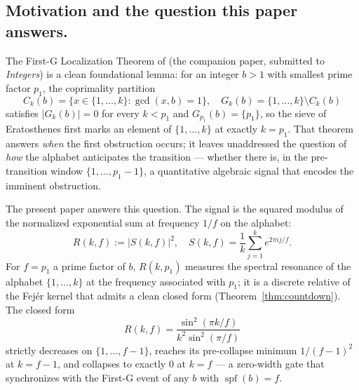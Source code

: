 \documentclass[11pt,reqno]{amsart}
\theoremstyle{plain}
\theoremstyle{definition}
\theoremstyle{remark}
\DeclareMathOperator{\spf}{spf}
\begin{document}
\subsection*{Motivation and the question this paper answers.}

The First-G Localization Theorem of \cite{J04Sanders} (the companion
paper, submitted to \emph{Integers}) is a clean foundational lemma:
for an integer $b > 1$ with smallest prime factor $p_1$, the
coprimality partition
\[
  C_k(b) = \{x \in \{1, \ldots, k\} : \gcd(x, b) = 1\},
  \quad
  G_k(b) = \{1, \ldots, k\} \setminus C_k(b)
\]
satisfies $|G_k(b)| = 0$ for every $k < p_1$ and
$G_{p_1}(b) = \{p_1\}$, so the sieve of Eratosthenes first marks an
element of $\{1, \ldots, k\}$ at exactly $k = p_1$. That theorem
answers \emph{when} the first obstruction occurs; it leaves
unaddressed the question of \emph{how} the alphabet anticipates the
transition --- whether there is, in the pre-transition window
$\{1, \ldots, p_1 - 1\}$, a quantitative algebraic signal that
encodes the imminent obstruction.

The present paper answers this question. The signal is the squared
modulus of the normalized exponential sum at frequency $1/f$ on the
alphabet:
\begin{equation}
  R(k, f) := |S(k, f)|^2,
  \quad
  S(k, f) = \frac{1}{k} \sum_{j=1}^{k} e^{2\pi i j / f}.
  \label{eq:Rdef}
\end{equation}
For $f = p_1$ a prime factor of $b$, $R(k, p_1)$ measures the
spectral resonance of the alphabet $\{1, \ldots, k\}$ at the
frequency associated with $p_1$; it is a discrete relative of the
Fej\'er kernel \cite{Fejer1900,Apostol1976} that admits a clean
closed form (Theorem~\ref{thm:countdown}). The closed form
\[
  R(k, f) = \frac{\sin^2(\pi k / f)}{k^2 \sin^2(\pi / f)}
\]
strictly decreases on $\{1, \ldots, f-1\}$, reaches its
pre-collapse minimum $1/(f-1)^2$ at $k = f-1$, and collapses to
exactly $0$ at $k = f$ --- a zero-width gate that synchronizes
with the First-G event of any $b$ with $\spf(b) = f$.
\end{document}
